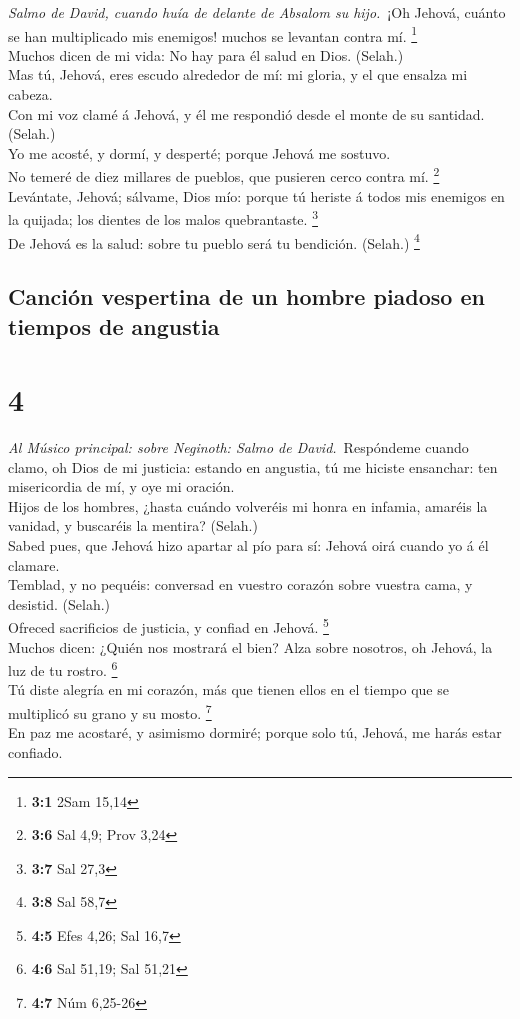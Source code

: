  \emph{Salmo de David, cuando huía de delante de Absalom su
hijo.}~¡Oh Jehová, cuánto se han multiplicado mis enemigos! muchos se
levantan contra mí. \footnote{\textbf{3:1} 2Sam 15,14}\\
 Muchos dicen de mi vida: No hay para él salud en Dios.
(Selah.)\\
 Mas tú, Jehová, eres escudo alrededor de mí: mi gloria, y
el que ensalza mi cabeza.\\
 Con mi voz clamé á Jehová, y él me respondió desde el monte
de su santidad. (Selah.)\\
 Yo me acosté, y dormí, y desperté; porque Jehová me
sostuvo.\\
 No temeré de diez millares de pueblos, que pusieren cerco
contra mí. \footnote{\textbf{3:6} Sal 4,9; Prov 3,24}\\
 Levántate, Jehová; sálvame, Dios mío: porque tú heriste á
todos mis enemigos en la quijada; los dientes de los malos quebrantaste.
\footnote{\textbf{3:7} Sal 27,3}\\
 De Jehová es la salud: sobre tu pueblo será tu bendición.
(Selah.) \footnote{\textbf{3:8} Sal 58,7}

\hypertarget{canciuxf3n-vespertina-de-un-hombre-piadoso-en-tiempos-de-angustia}{%
\subsection{Canción vespertina de un hombre piadoso en tiempos de
angustia}\label{canciuxf3n-vespertina-de-un-hombre-piadoso-en-tiempos-de-angustia}}

\hypertarget{section-3}{%
\section{4}\label{section-3}}

 \emph{Al Músico principal: sobre Neginoth: Salmo de
David.}~Respóndeme cuando clamo, oh Dios de mi justicia: estando en
angustia, tú me hiciste ensanchar: ten misericordia de mí, y oye mi
oración.\\
 Hijos de los hombres, ¿hasta cuándo volveréis mi honra en
infamia, amaréis la vanidad, y buscaréis la mentira? (Selah.)\\
 Sabed pues, que Jehová hizo apartar al pío para sí: Jehová
oirá cuando yo á él clamare.\\
 Temblad, y no pequéis: conversad en vuestro corazón sobre
vuestra cama, y desistid. (Selah.)\\
 Ofreced sacrificios de justicia, y confiad en Jehová.
\footnote{\textbf{4:5} Efes 4,26; Sal 16,7}\\
 Muchos dicen: ¿Quién nos mostrará el bien? Alza sobre
nosotros, oh Jehová, la luz de tu rostro. \footnote{\textbf{4:6} Sal
  51,19; Sal 51,21}\\
 Tú diste alegría en mi corazón, más que tienen ellos en el
tiempo que se multiplicó su grano y su mosto. \footnote{\textbf{4:7} Núm
  6,25-26}\\
 En paz me acostaré, y asimismo dormiré; porque solo tú,
Jehová, me harás estar confiado.

